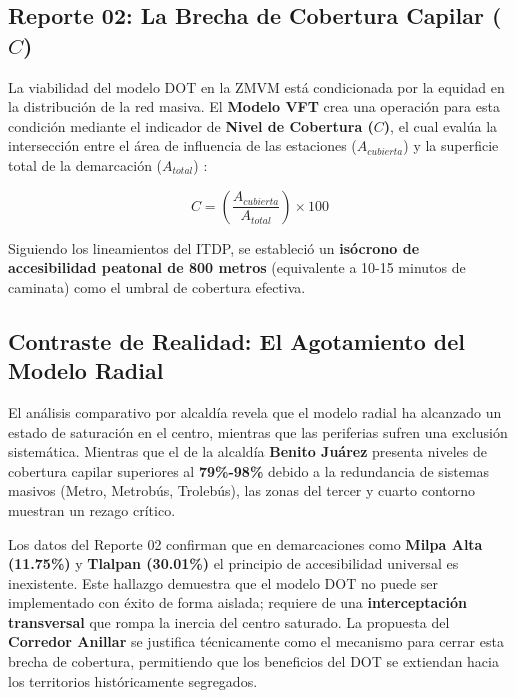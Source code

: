 \subsection{Reporte 02: La Brecha de Cobertura Capilar ($C$)}
\label{subsubsec:reporte-02}

La viabilidad del modelo DOT en la ZMVM está condicionada por la equidad en la distribución 
de la red masiva. El \textbf{Modelo VFT} crea una operación para esta condición mediante 
el indicador de \textbf{Nivel de Cobertura ($C$)}, el cual evalúa la intersección 
entre el área de influencia de las estaciones ($A_{cubierta}$) y la superficie total 
de la demarcación ($A_{total}$) \cite{Garibaldi2024VFT, Garibaldi2024_R02}:

\begin{equation}
    C = \left( \frac{A_{cubierta}}{A_{total}} \right) \times 100
\end{equation}

Siguiendo los lineamientos del ITDP, se estableció un 
\textbf{isócrono de accesibilidad peatonal de 800 metros} 
(equivalente a 10-15 minutos de caminata) como el umbral de 
cobertura efectiva. 

\subsection{Contraste de Realidad: El Agotamiento del Modelo Radial}
\label{subsubsec:agotamiento-radial}

El análisis comparativo por alcaldía revela que el modelo radial ha alcanzado 
un estado de saturación en el centro, mientras que las periferias sufren una 
exclusión sistemática. Mientras que el  
de la alcaldía \textbf{Benito Juárez} presenta niveles de cobertura capilar 
superiores al \textbf{79\%-98\%} debido a la redundancia de sistemas masivos 
(Metro, Metrobús, Trolebús), las zonas del tercer y cuarto contorno muestran un 
rezago crítico.

Los datos del Reporte 02 confirman que en demarcaciones como \textbf{Milpa Alta (11.75\%)} 
y \textbf{Tlalpan (30.01\%)} el principio de accesibilidad universal es inexistente. 
Este hallazgo demuestra que el modelo DOT no puede ser implementado con éxito de forma 
aislada; requiere de una \textbf{interceptación transversal} que rompa la inercia del 
centro saturado. La propuesta del \textbf{Corredor Anillar} se justifica técnicamente 
como el mecanismo para cerrar esta brecha de cobertura, permitiendo que los beneficios 
del DOT se extiendan hacia los territorios históricamente segregados.
